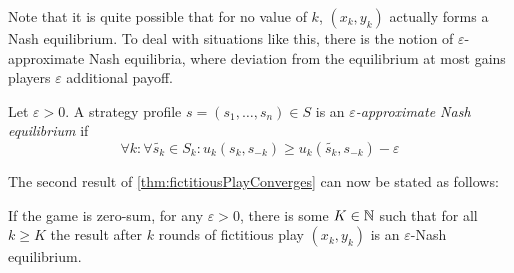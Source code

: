 \documentclass[a4paper]{scrreprt}
\let\epsilon\varepsilon
\begin{document}
    Note that it is quite possible that for no value of $k$, $(x_k, y_k)$ actually forms a Nash equilibrium.
    To deal with situations like this, there is the notion of $\epsilon$-approximate Nash equilibria, where deviation from the equilibrium at most gains players $\epsilon$ additional payoff.
        
    \begin{defn}
        Let $\epsilon > 0$.
        A strategy profile $s = (s_1, \dots, s_n) \in S$ is an \emph{$\epsilon$-approximate Nash equilibrium} if
        \[
            \forall k: \forall \tilde{s_k} \in S_k: u_k(s_k, s_{-k}) \geq u_k(\tilde{s_k}, s_{-k}) - \epsilon
        \]
    \end{defn}

    The second result of \ref{thm:fictitiousPlayConverges} can now be stated as follows:
    \begin{cor}
        If the game is zero-sum, for any $\epsilon > 0$, there is some $K \in \mathbb{N}$ such that for all $k \geq K$ the result after $k$ rounds of fictitious play $(x_k, y_k)$ is an $\epsilon$-Nash equilibrium.
    \end{cor}

    
    
    
    
    
    
\end{document}
